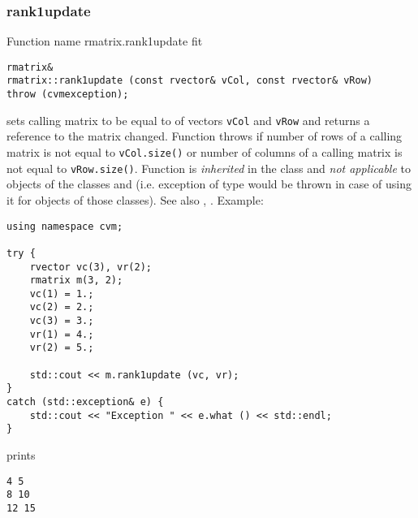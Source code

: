 \subsubsection{rank1update}
Function%
\pdfdest name {rmatrix.rank1update} fit
\begin{verbatim}
rmatrix&
rmatrix::rank1update (const rvector& vCol, const rvector& vRow)
throw (cvmexception);
\end{verbatim}
sets  calling matrix to be equal to 
 of vectors
\verb"vCol" and \verb"vRow"
and returns a reference to
the matrix changed.
Function throws  
if  number of rows of a calling matrix
is not equal to \verb"vCol.size()"
or
 number of columns of a calling matrix
is not equal to \verb"vRow.size()".
Function is \emph{inherited} in  the class
 and
\emph{not applicable} to objects of the classes
 and
 (i.e. exception of
type  would be thrown
in case of using it for objects of those classes).
See also ,
.
Example:
\begin{Verbatim}
using namespace cvm;

try {
    rvector vc(3), vr(2);
    rmatrix m(3, 2);
    vc(1) = 1.;
    vc(2) = 2.;
    vc(3) = 3.;
    vr(1) = 4.;
    vr(2) = 5.;

    std::cout << m.rank1update (vc, vr);
}
catch (std::exception& e) {
    std::cout << "Exception " << e.what () << std::endl;
}
\end{Verbatim}
prints
\begin{Verbatim}
4 5
8 10
12 15
\end{Verbatim}
\newpage




